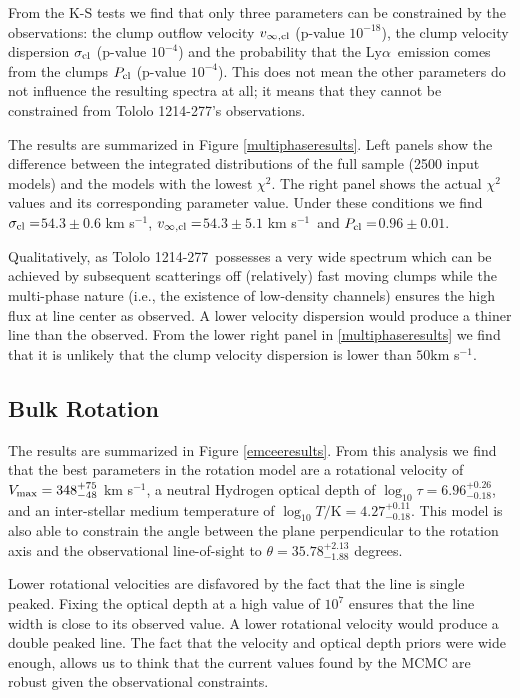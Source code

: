 \documentclass[a4,useAMS,usenatbib,usegraphicx]{mn2e}
\newcommand{\tol}{Tololo 1214-277}
\newcommand{\lya}{Ly$\alpha$}
\newcommand{\kms}{km s$^{-1}$}
\newcommand{\sigmaclump}{$54.3\pm 0.6$ km s$^{-1}$}
\newcommand{\inftyclump}{$54.3\pm 5.1$ km s$^{-1}$}
\newcommand{\probaclump}{$0.96\pm 0.01$}
\begin{document}
From the K-S tests we find that only three parameters can be
constrained by the observations: the clump outflow velocity
$v_{\infty,\rm{cl}}$ (p-value  $10^{-18}$), the clump velocity
dispersion $\sigma_{\rm cl}$ (p-value $10^{-4}$) and the probability
that the \lya\ emission comes from the clumps $P_{\rm cl}$ (p-value
$10^{-4}$).
This does not mean the other parameters do not influence the resulting
spectra at all; it means that they cannot be constrained from \tol's
observations.


The results are summarized in Figure \ref{multiphaseresults}.
Left panels show the difference between the integrated distributions
of the full sample (2500 input models) and the models with the lowest
$\chi^2$. 
The right panel shows the actual $\chi^2$ values and its corresponding
parameter value. 
Under these conditions we find $\sigma_{\rm cl}=$\sigmaclump,
$v_{\infty {\rm, cl}}=$\inftyclump\ and $P_{\rm cl}=$\probaclump. 

Qualitatively, as \tol\ possesses a very wide spectrum which can be
achieved by subsequent scatterings off (relatively) fast moving clumps
while the multi-phase nature (i.e., the existence of low-density
channels) ensures the high flux at line center as observed.
A lower velocity dispersion would produce a thiner line than the
observed.
From the lower right panel in \ref{multiphaseresults} we find that it
is unlikely that the clump velocity dispersion is lower than
$50$\kms. 


\subsection{Bulk Rotation}


The results are summarized in  Figure \ref{emceeresults}. 
From this analysis we find that the best parameters in the rotation
model are a rotational velocity of  $V_{\rm max}=348^{+75}_{-48}$
\kms, a neutral Hydrogen optical depth of
$\log_{10}\tau=6.96^{+0.26}_{-0.18}$,  and an inter-stellar medium
temperature of $\log_{10} T/\mathrm {K} = 4.27^{+0.11}_{-0.18}$.   
This model is also able to constrain the angle between the plane
perpendicular to the rotation axis and the observational line-of-sight
to $\theta = 35.78^{+2.13}_{-1.88}$ degrees.

Lower rotational velocities are disfavored by the fact that the line
is single peaked.
Fixing the optical depth at a high value of $10^7$ ensures that the line width
is close to its observed value.
A lower rotational velocity would produce a double peaked line.
The fact that the velocity and optical depth priors were wide enough,
allows us to think that the current values found by the MCMC are
robust given the observational constraints.
\end{document}
